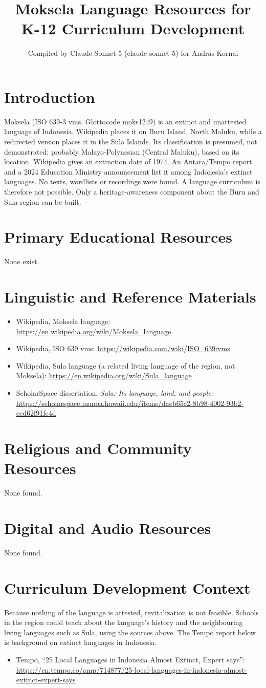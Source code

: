 \documentclass[12pt]{article}
\title{Moksela Language Resources for K-12 Curriculum Development}
\author{Compiled by Claude Sonnet 5 (claude-sonnet-5) for Andr\'as Kornai}
\date{}
\begin{document}
\maketitle
\section{Introduction}
Moksela (ISO 639-3 vms, Glottocode moks1249) is an extinct and unattested language of Indonesia. Wikipedia places it on Buru Island, North Maluku, while a redirected version places it in the Sula Islands. Its classification is presumed, not demonstrated: probably Malayo-Polynesian (Central Maluku), based on its location. Wikipedia gives an extinction date of 1974. An Antara/Tempo report and a 2024 Education Ministry announcement list it among Indonesia's extinct languages. No texts, wordlists or recordings were found. A language curriculum is therefore not possible. Only a heritage-awareness component about the Buru and Sula region can be built.
\section{Primary Educational Resources}
None exist.
\section{Linguistic and Reference Materials}
\begin{itemize}
\item Wikipedia, Moksela language: \url{https://en.wikipedia.org/wiki/Moksela_language}
\item Wikipedia, ISO 639 vms: \url{https://wikipedia.com/wiki/ISO_639:vms}
\item Wikipedia, Sula language (a related living language of the region, not Moksela): \url{https://en.wikipedia.org/wiki/Sula_language}
\item ScholarSpace dissertation, \emph{Sula: Its language, land, and people}: \url{https://scholarspace.manoa.hawaii.edu/items/daeb65e2-8b98-4002-93b2-ced62f91fe4d}
\end{itemize}
\section{Religious and Community Resources}
None found.
\section{Digital and Audio Resources}
None found.
\section{Curriculum Development Context}
Because nothing of the language is attested, revitalization is not feasible. Schools in the region could teach about the language's history and the neighbouring living languages such as Sula, using the sources above. The Tempo report below is background on extinct languages in Indonesia.
\begin{itemize}
\item Tempo, ``25 Local Languages in Indonesia Almost Extinct, Expert says'': \url{https://en.tempo.co/amp/714877/25-local-languages-in-indonesia-almost-extinct-expert-says}
\end{itemize}
\end{document}

